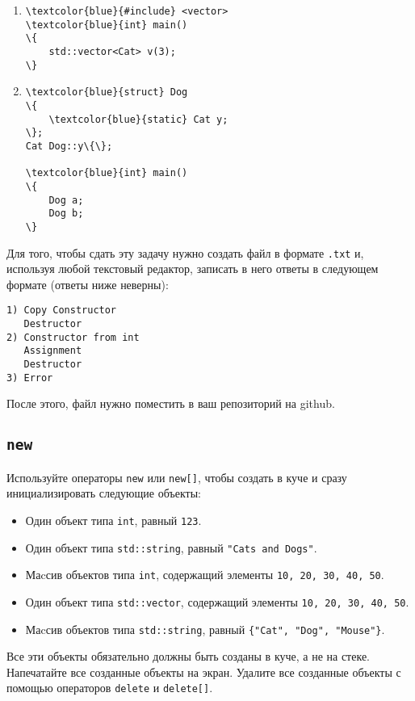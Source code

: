 \documentclass{article}
\begin{document}
\begin{enumerate}
\item \begin{Verbatim}[commandchars=\\\{\}]
\textcolor{blue}{#include} <vector>
\textcolor{blue}{int} main()
\{
    std::vector<Cat> v(3);
\}
\end{Verbatim}

\item \begin{Verbatim}[commandchars=\\\{\}]
\textcolor{blue}{struct} Dog
\{
    \textcolor{blue}{static} Cat y;
\};
Cat Dog::y\{\};

\textcolor{blue}{int} main()
\{
    Dog a;
    Dog b;
\}
\end{Verbatim}



\end{enumerate}
Для того, чтобы сдать эту задачу нужно создать файл в формате \texttt{.txt} и, используя любой текстовый редактор, записать в него ответы в следующем формате (ответы ниже неверны):
\begin{verbatim}
1) Copy Constructor
   Destructor
2) Constructor from int
   Assignment
   Destructor
3) Error
\end{verbatim} 
После этого, файл нужно поместить в ваш репозиторий на github.



\subsection{\texttt{new}}
Используйте операторы \texttt{new} или \texttt{new[]}, чтобы создать в куче и сразу инициализировать следующие объекты:
\begin{itemize}
\item Один объект типа \texttt{int}, равный \texttt{123}.
\item Один объект типа \texttt{std::string}, равный \texttt{"Cats and Dogs"}.
\item Маcсив объектов типа \texttt{int}, содержащий элементы \texttt{10, 20, 30, 40, 50}.
\item Один объект типа \texttt{std::vector}, содержащий элементы \texttt{10, 20, 30, 40, 50}.
\item Маcсив объектов типа \texttt{std::string}, равный \texttt{\{"Cat"{}, "Dog"{}, "Mouse"\}}.
\end{itemize}
Все эти объекты обязательно должны быть созданы в куче, а не на стеке.
Напечатайте все созданные объекты на экран.
Удалите все созданные объекты с помощью операторов \texttt{delete} и \texttt{delete[]}.
\end{document}
